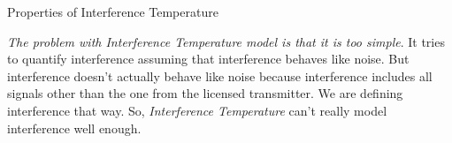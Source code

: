 \documentclass[mathserif]{beamer}
\begin{document}
\begin{frame}{Properties of Interference Temperature}

\emph{The problem with Interference Temperature model is that it is too simple}. It tries to quantify interference assuming that interference behaves like noise. But interference doesn't actually behave like noise because interference includes all signals other than the one from the licensed transmitter. We are defining interference that way. So, \emph{Interference Temperature} can't really model interference well enough.

\end{frame}

%

%
%
\end{document}
